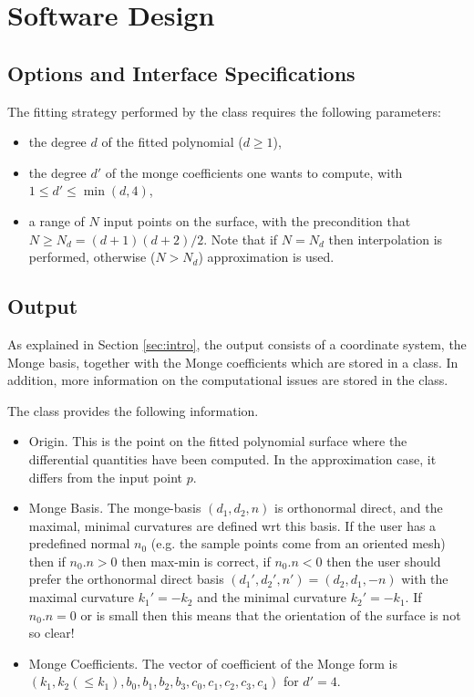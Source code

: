 \section{Software Design}

\subsection{Options and Interface Specifications}

The fitting strategy performed by the class
 requires the following parameters:
\begin{itemize}
\item
the degree $d$ of the fitted polynomial ($d \geq 1$),
\item
the degree $d'$ of the monge coefficients one wants to compute, with
$1 \leq d' \leq \min(d,4)  $,
\item
a range of $N$ input points on the surface, with the precondition that
$N \geq N_d = (d+1)(d+2)/2$. Note that if $N=N_d$ then interpolation
is performed, otherwise ($N >N_d$) approximation is used.
\end{itemize}

\subsection{Output}

As explained in Section \ref{sec:intro}, the output consists of a
coordinate system, the Monge basis, together with the Monge
coefficients which are stored in a  class. In
addition, more information on the computational issues are stored in
the  class.

The  class provides the following information.

\begin{itemize}
\item Origin. This is the point on the fitted polynomial surface
where the differential quantities have been computed. In the
approximation case, it differs from the input point $p$.

\item Monge Basis. The monge-basis $(d_1,d_2,n)$ is orthonormal
direct, and the maximal, minimal curvatures are defined wrt this
basis. If the user has a predefined normal $n_0$ (e.g. the sample
points come from an oriented mesh) then if $n_0 . n >0$ then max-min is
correct, if $n_0 . n <0$ then the user should prefer the orthonormal
direct basis $(d_1',d_2',n')=(d_2,d_1,-n)$ with the maximal curvature
$k_1'=-k_2$ and the minimal curvature $k_2'=-k_1$. If $n_0 . n =0$ or
is small then this means that the orientation of the surface is not so
clear!

\item Monge Coefficients.
The vector of coefficient of the Monge form is $(k_1, k_2 (\leq k_1),
b_0, b_1, b_2, b_3, c_0, c_1, c_2, c_3, c_4)$ for $d' = 4$.

\end{itemize}

